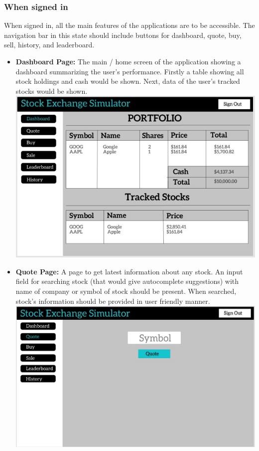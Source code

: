 \documentclass[12 pt, a4paper]{report}
\begin{document}
	\subsubsection{When signed in}
	When signed in, all the main features of the applications are to be accessible. The navigation bar in this state should include buttons for dashboard, quote, buy, sell, history, and leaderboard.
	\begin{itemize}
		\item \textbf{Dashboard Page:} The main / home screen of the application showing a dashboard summarizing the user's performance. Firstly a table showing all stock holdings and cash would be shown. Next, data of the user's tracked stocks would  be shown.\\
		\includegraphics[scale=0.5,keepaspectratio]{Dashboard}
		\item \textbf{Quote Page: } A page to get latest information about any stock. An input field for searching stock (that would give autocomplete suggestions) with name of company or symbol of stock should be present. When searched, stock's information should be provided in user friendly manner.\\
		\includegraphics[scale=0.5,keepaspectratio]{quote1}

\end{itemize}
\end{document}
